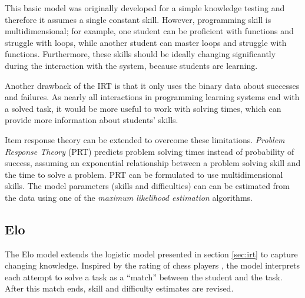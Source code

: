 This basic model was originally developed for a simple knowledge testing
  and therefore it assumes a single constant skill.
However, programming skill is multidimensional;
  for example, one student can be proficient with functions and struggle with loops,
  while another student can master loops and struggle with functions.
Furthermore, these skills should be ideally changing significantly during
  the interaction with the system, because students are learning.

Another drawback of the IRT is that it only uses
  the binary data about successes and failures.
As nearly all interactions in programming learning systems end with a solved task,
  it would be more useful to work with solving times,
  which can provide more information about students' skills.

Item response theory can be extended to overcome these limitations.
\emph{Problem Response Theory} (PRT)
\cite{alg.problem-response-theory, pelanek-student-modeling-times}
predicts problem solving times instead of probability of success,
assuming an exponential relationship between a problem solving skill
and the time to solve a problem.
PRT can be formulated to use multidimensional skills.
The model parameters (skills and difficulties) can can be estimated from the data
  using one of the \emph{maximum likelihood estimation} algorithms.





\subsection{Elo}
\label{sec:elo}

The Elo model \cite{alg.elo}
  extends the logistic model presented in section \ref{sec:irt}
  to capture changing knowledge.
Inspired by the rating of chess players \cite{elo-rating},
  the model interprets each attempt  to solve a task
  as a ``match'' between the student and the task.
After this match ends, skill and difficulty estimates are revised.


